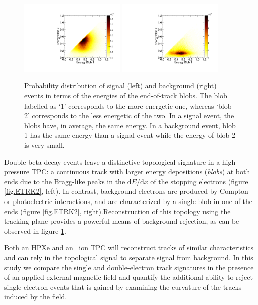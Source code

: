\documentclass{JINST}
\begin{document}
\begin{figure}[!htb]
\centering
\includegraphics[width=0.45\textwidth]{img/EnergyBlobsSignal.pdf}
\includegraphics[width=0.45\textwidth]{img/EnergyBlobsTl208.pdf}
\caption{Probability distribution of signal (left) and background (right) events in terms of the energies of the end-of-track blobs. The blob labelled as `1' corresponds to the more energetic one, whereas `blob 2' corresponds to the less energetic of the two. In a signal event, the blobs have, in average, the same energy. In a background event, blob 1 has the same energy than a signal event while the energy of blob 2 is very small.} \label{fig.BLOBS}
\end{figure}


Double beta decay events leave a distinctive topological signature in a high pressure TPC: a continuous track with larger energy depositions (\emph{blobs}) at both ends due to the Bragg-like peaks in the d$E$/d$x$ of the stopping electrons (figure \ref{fig.ETRK2}, left). In contrast, background electrons are produced by Compton or photoelectric interactions, and are characterized by a single blob in one of the ends (figure \ref{fig.ETRK2}, right).Reconstruction of this topology using the tracking plane provides a powerful means of background rejection, as can be observed in figure \ref{fig.BLOBS}.

Both an HPXe and an \SEHF\ ion TPC will reconstruct tracks of similar characteristics and can rely in the topological signal to separate signal from background.   
In this study we compare the single and double-electron track signatures in the presence of an applied external magnetic field and quantify the additional ability to reject single-electron events that is gained by examining the curvature of the tracks induced by the field.
\end{document}
